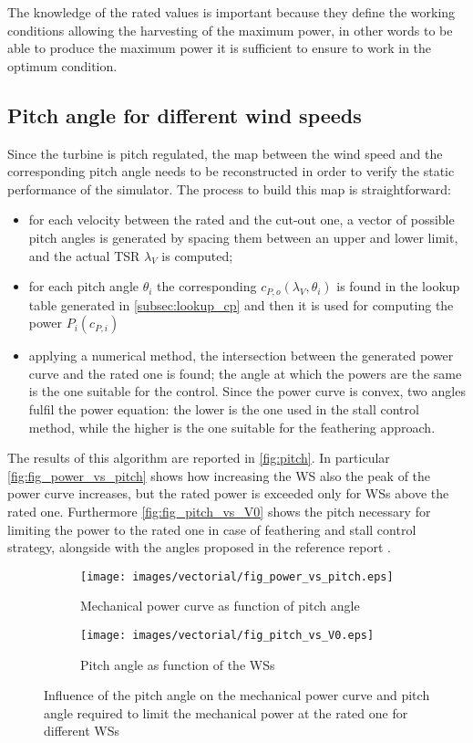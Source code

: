 The knowledge of the rated values is important because they define the working conditions allowing the harvesting of the maximum power, in other words to be able to produce the maximum power it is sufficient to ensure to work in the optimum condition.

\subsection{Pitch angle for different wind speeds}\label{subsec:pitch_map}
Since the turbine is pitch regulated, the map between the wind speed and the corresponding pitch angle needs to be reconstructed in order to verify the static performance of the simulator. The process to build this map is straightforward: 
\begin{itemize}
    \item for each velocity between the rated and the cut-out one, a vector of possible pitch angles is generated by spacing them between an upper and lower limit, and the actual \acrshort{TSR} $\lambda_V$ is computed;
    \item for each pitch angle $\theta_i$ the corresponding $c_{P,o}(\lambda_V, \theta_i)$ is found in the lookup table generated in \autoref{subsec:lookup_cp} and then it is used for computing the power $P_i(c_{P,i})$ 
    \item applying a numerical method, the intersection between the generated power curve and the rated one is found; the angle at which the powers are the same is the one suitable for the control. Since the power curve is convex, two angles fulfil the power equation: the lower is the one used in the stall control method, while the higher is the one suitable for the feathering approach.
\end{itemize}
The results of this algorithm are reported in \autoref{fig:pitch}. In particular \autoref{fig:fig_power_vs_pitch} shows how increasing the \acrshort{WS} also the peak of the power curve increases, but the rated power is exceeded only for \acrshort{WSs} above the rated one. Furthermore \autoref{fig:fig_pitch_vs_V0} shows the pitch necessary for limiting the power to the rated one in case of feathering and stall control strategy, alongside with the angles proposed in the reference report \cite{DTU_Wind_Energy_Report-I-0092}. 
\begin{figure}[htb]
    \centering
    \begin{subfigure}{0.49\textwidth}
    \centering
    \texttt{[image: images/vectorial/fig\_power\_vs\_pitch.eps]}
    \caption{Mechanical power curve as function of pitch angle}
    \label{fig:fig_power_vs_pitch}
    \end{subfigure}
    \begin{subfigure}{0.49\textwidth}
    \texttt{[image: images/vectorial/fig\_pitch\_vs\_V0.eps]}
    \caption{Pitch angle as function of the \acrshort{WSs}}
    \label{fig:fig_pitch_vs_V0}
    \end{subfigure}
    \caption{Influence of the pitch angle on the mechanical power curve and pitch angle required to limit the mechanical power at the rated one for different \acrshort{WSs}}
    \label{fig:pitch}
\end{figure}
